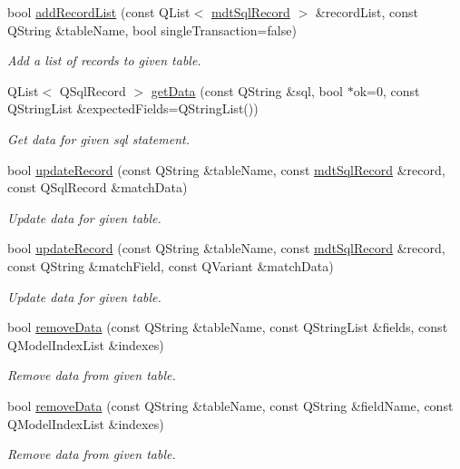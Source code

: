 \begin{DoxyCompactItemize}
bool \hyperlink{classmdt_tt_base_a26339dbcc81ba941b94f80a6769bd99d}{add\-Record\-List} (const Q\-List$<$ \hyperlink{classmdt_sql_record}{mdt\-Sql\-Record} $>$ \&record\-List, const Q\-String \&table\-Name, bool single\-Transaction=false)
\begin{DoxyCompactList}\small\item\em Add a list of records to given table. \end{DoxyCompactList}\item 
Q\-List$<$ Q\-Sql\-Record $>$ \hyperlink{classmdt_tt_base_aac6b0c135d2ff61d23ee9b37525a8ad5}{get\-Data} (const Q\-String \&sql, bool $\ast$ok=0, const Q\-String\-List \&expected\-Fields=Q\-String\-List())
\begin{DoxyCompactList}\small\item\em Get data for given sql statement. \end{DoxyCompactList}\item 
bool \hyperlink{classmdt_tt_base_a40a9416a29d96518f39b2225516a2786}{update\-Record} (const Q\-String \&table\-Name, const \hyperlink{classmdt_sql_record}{mdt\-Sql\-Record} \&record, const Q\-Sql\-Record \&match\-Data)
\begin{DoxyCompactList}\small\item\em Update data for given table. \end{DoxyCompactList}\item 
bool \hyperlink{classmdt_tt_base_a884be1a05bf38121afda06758ff6ac41}{update\-Record} (const Q\-String \&table\-Name, const \hyperlink{classmdt_sql_record}{mdt\-Sql\-Record} \&record, const Q\-String \&match\-Field, const Q\-Variant \&match\-Data)
\begin{DoxyCompactList}\small\item\em Update data for given table. \end{DoxyCompactList}\item 
bool \hyperlink{classmdt_tt_base_a7b328098b5813497aedfb764a1ff787f}{remove\-Data} (const Q\-String \&table\-Name, const Q\-String\-List \&fields, const Q\-Model\-Index\-List \&indexes)
\begin{DoxyCompactList}\small\item\em Remove data from given table. \end{DoxyCompactList}\item 
bool \hyperlink{classmdt_tt_base_a496e6e995a6bc4e72cade216520898e9}{remove\-Data} (const Q\-String \&table\-Name, const Q\-String \&field\-Name, const Q\-Model\-Index\-List \&indexes)
\begin{DoxyCompactList}\small\item\em Remove data from given table. \end{DoxyCompactList}\item 

\end{DoxyCompactItemize}

